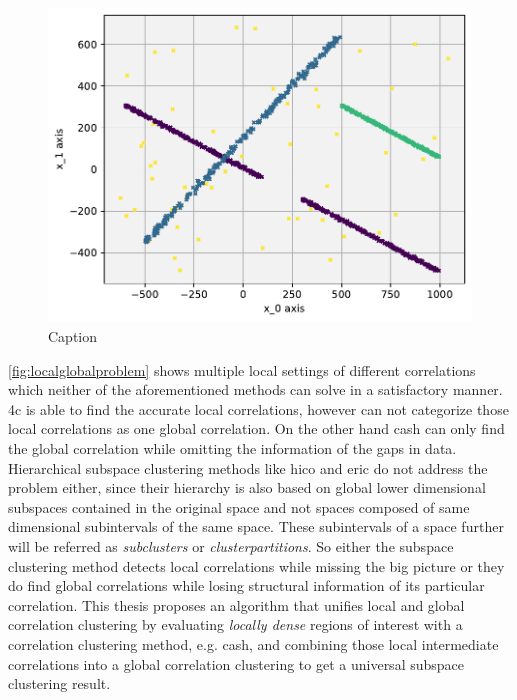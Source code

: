 \begin{figure}
    \centering
    \includegraphics[width=.6\textwidth]{figures_method/Groundtruth.pdf}
    \caption{Caption}
    \label{fig:localglobalproblem}
\end{figure}

\autoref{fig:localglobalproblem}  shows multiple local settings of different correlations which neither of the aforementioned methods can solve in a satisfactory manner. \gls{4c} is able to find the accurate local correlations, however can not categorize those local correlations as one global correlation. 
On the other hand \gls{cash} can only find the global correlation while omitting the information of the gaps in data. Hierarchical subspace clustering methods like \acrshort{hico} and \acrshort{eric} do not address the problem either, since their hierarchy is also based on global lower dimensional subspaces contained in the original space and not spaces composed of same dimensional subintervals of the same space. These subintervals of a space further will be referred as \textit{subclusters} or \textit{clusterpartitions}.
So either the subspace clustering method detects local correlations while missing the big picture or they do find global correlations while losing structural information of its particular correlation. This thesis proposes an algorithm that unifies local and global correlation clustering by evaluating \textit{locally dense} regions of interest with a correlation clustering method, e.g. \gls{cash}, and combining those local intermediate correlations into a global correlation clustering to get a universal subspace clustering result. 


